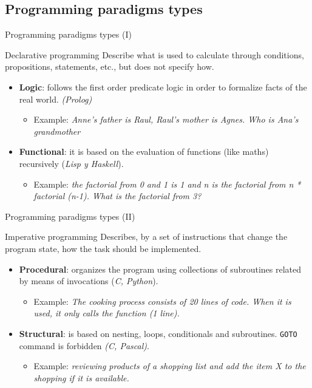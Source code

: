 \documentclass[10pt,compress]{beamer} %
\begin{document}
\subsection[Programming paradigms types]{Programming paradigms types}

\begin{frame}{Programming paradigms types (I)}{}
	\begin{block}{Declarative programming}
Describe \alert{what} is used to calculate through conditions, propositions, statements, etc., but does not specify \alert{how}.
  	\end{block}
  	\begin{itemize}
  		\item \textbf{Logic}: follows the first order predicate logic in order to formalize facts of the real world. 								  \textit{(Prolog)}
  		\begin{itemize}
  			\item Example: \textit{Anne's father is Raul, Raul's mother is Agnes. Who is Ana's grandmother} 
  		\end{itemize}
  		\item \textbf{Functional}: it is based on the evaluation of functions (like maths) recursively  (\textit{Lisp y Haskell}).
  		\begin{itemize}
  			\item Example: \textit{the factorial from 0 and 1 is 1 and n is the factorial from n * factorial (n-1). What is the factorial from 3?} 
  		\end{itemize}
  	\end{itemize}
\end{frame}

\begin{frame}{Programming paradigms types (II)}
	\begin{block}{Imperative programming}
		Describes, by a set of instructions that change the \alert{program state}, \alert{how} the task should be implemented.  
  	\end{block}
  	\begin{itemize}
  		\item \textbf{Procedural}: organizes the program using collections of subroutines related by means of invocations (\textit{C, Python}).
  		\begin{itemize}
  			\item Example: \textit{The cooking process consists of 20 lines of code. When it is used, it only calls the function (1 line).} 
  		\end{itemize}
  		\item \textbf{Structural}: is based on nesting, loops, conditionals and subroutines. \texttt{GOTO} command is forbidden 				 \textit{(C, Pascal)}.
  		\begin{itemize}
  			\item Example: \textit{reviewing products of a shopping list and add the item X to the shopping if it is available.} 
  		\end{itemize}
  	\end{itemize}
\end{frame}
\end{document}

